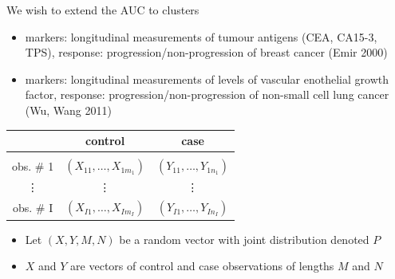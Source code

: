 \documentclass{beamer}
\newcommand{\I}{I}
\renewcommand{\P}{P}
\begin{document}
\begin{frame}
  We wish to extend the AUC to clusters



  \begin{itemize}
  \item markers: longitudinal measurements of tumour antigens (CEA,
    CA15-3, TPS), response: progression/non-progression of breast
    cancer (Emir 2000)


  \item markers: longitudinal measurements of levels of vascular
    enothelial growth factor, %
    response: progression/non-progression of non-small cell lung
    cancer (Wu, Wang 2011)
   \end{itemize}
 \end{frame}

 \begin{frame}
  \centering
  \begin{tabular}{c | c | c}
    & control & case\\
    \hline&&\\
    obs. \# 1 & $(X_{11},\ldots,X_{1m_1})$ & $(Y_{11},\ldots,Y_{1n_1})$\\
    \vdots & \vdots & \vdots\\
    obs. \# \I & $(X_{\I1},\ldots,X_{\I m_{\I}})$ & $(Y_{\I1},\ldots,Y_{\I n_{\I}})$\\
  \end{tabular}
 \begin{itemize}
  \item     Let $(X,Y,M,N)$ be a random vector
    with joint distribution denoted $\P$
  \item $X$ and $Y$ are vectors of control and case observations of lengths $M$ and $N$
  \end{itemize}
\end{frame}
\end{document}

